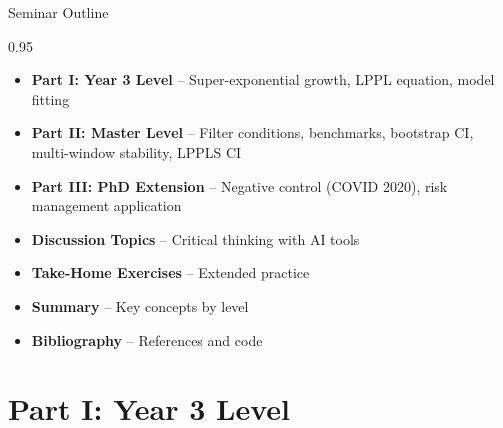 \documentclass[9pt, aspectratio=169, t]{beamer}
\subtitle{Seminar 13: LPPL Models for Bubble Detection}
\begin{document}
{
\begin{frame}
    \titlepage
\end{frame}
}

\begin{frame}{Seminar Outline}
    \begin{cminipage}{0.95\textwidth}
    \begin{itemize}
        \item \textbf{Part I: Year 3 Level} -- Super-exponential growth, LPPL equation, model fitting
        \vspace{0.15cm}
        \item \textbf{Part II: Master Level} -- Filter conditions, benchmarks, bootstrap CI, multi-window stability, LPPLS CI
        \vspace{0.15cm}
        \item \textbf{Part III: PhD Extension} -- Negative control (COVID 2020), risk management application
        \vspace{0.15cm}
        \item \textbf{Discussion Topics} -- Critical thinking with AI tools
        \vspace{0.15cm}
        \item \textbf{Take-Home Exercises} -- Extended practice
        \vspace{0.15cm}
        \item \textbf{Summary} -- Key concepts by level
        \vspace{0.15cm}
        \item \textbf{Bibliography} -- References and code
    \end{itemize}
    \end{cminipage}
\end{frame}

\section{Part I: Year 3 Level}
\end{document}
